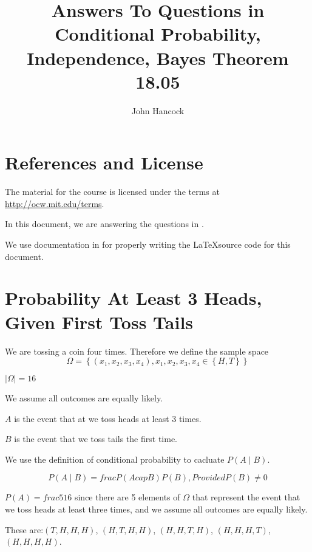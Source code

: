 \documentclass[a4paper,11pt]{article}
\author{John Hancock}
\title{Answers To Questions in Conditional Probability, Independence, 
Bayes Theorem 18.05}
\begin{document}
\maketitle
\tableofcontents
\section{References and License}
The material for the course is licensed under the terms at 
\url{http://ocw.mit.edu/terms}.

In this document, we are answering the questions in \cite{slides3}.

We use documentation in for properly writing the
\LaTeX source code for this document.
 
\label{prob1}
\section{Probability At Least 3 Heads, Given First Toss Tails}

We are tossing a coin four times. Therefore we define the sample space
\begin{equation}
  \Omega = \left\{ \left( x_{1}, x_{2}, x_{3}, x_{4} \right), 
    x_{1}, x_{2}, x_{3}, x_{4} \in \left\{H, T \right\} \right\}
\end{equation}

$ \left| \Omega \right| = 16$

We assume all outcomes are equally likely.

$A$ is the event that at we toss heads at least 3 times.

$B$ is the event that we toss tails the first time.


We use the definition of conditional probability to cacluate
$P \left( A \mid B \right)$.

\begin{equation} \label{defCondProb}
P \left( A \mid B \right) = frac{ P \left( A cap B \right) } 
  { P \left( B \right) }, Provided P \left( B \right) \neq 0
\end{equation}

$P\left(A \right) = frac{5}{16}$ since there are 5 elements of $\Omega$
that represent the event that we toss heads at least three times, and
we assume all outcomes are equally likely.

These are:$\left(T,H,H,H \right)$, $\left(H,T,H,H \right)$, 
$\left(H,H,T,H \right)$, $\left(H,H,H,T \right)$, 
$\left(H,H,H,H \right)$.
\end{document}
